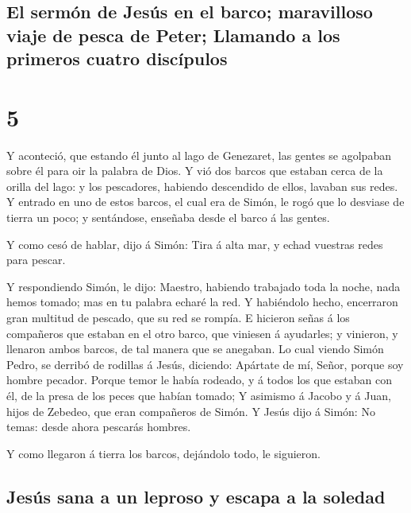 \hypertarget{el-sermuxf3n-de-jesuxfas-en-el-barco-maravilloso-viaje-de-pesca-de-peter-llamando-a-los-primeros-cuatro-discuxedpulos}{%
\subsection{El sermón de Jesús en el barco; maravilloso viaje de pesca
de Peter; Llamando a los primeros cuatro
discípulos}\label{el-sermuxf3n-de-jesuxfas-en-el-barco-maravilloso-viaje-de-pesca-de-peter-llamando-a-los-primeros-cuatro-discuxedpulos}}

\hypertarget{section-42-5}{%
\section{5}\label{section-42-5}}

 Y aconteció, que estando él junto al lago de Genezaret,
las gentes se agolpaban sobre él para oir la palabra de Dios.
 Y vió dos barcos que estaban cerca de la orilla del lago:
y los pescadores, habiendo descendido de ellos, lavaban sus redes.
 Y entrado en uno de estos barcos, el cual era de Simón,
le rogó que lo desviase de tierra un poco; y sentándose, enseñaba desde
el barco á las gentes.

 Y como cesó de hablar, dijo á Simón: Tira á alta mar, y
echad vuestras redes para pescar.

 Y respondiendo Simón, le dijo: Maestro, habiendo
trabajado toda la noche, nada hemos tomado; mas en tu palabra echaré la
red.  Y habiéndolo hecho, encerraron gran multitud de
pescado, que su red se rompía.  E hicieron señas á los
compañeros que estaban en el otro barco, que viniesen á ayudarles; y
vinieron, y llenaron ambos barcos, de tal manera que se anegaban.
 Lo cual viendo Simón Pedro, se derribó de rodillas á
Jesús, diciendo: Apártate de mí, Señor, porque soy hombre pecador.
 Porque temor le había rodeado, y á todos los que estaban
con él, de la presa de los peces que habían tomado;  Y
asimismo á Jacobo y á Juan, hijos de Zebedeo, que eran compañeros de
Simón. Y Jesús dijo á Simón: No temas: desde ahora pescarás hombres.

 Y como llegaron á tierra los barcos, dejándolo todo, le
siguieron.

\hypertarget{jesuxfas-sana-a-un-leproso-y-escapa-a-la-soledad}{%
\subsection{Jesús sana a un leproso y escapa a la
soledad}\label{jesuxfas-sana-a-un-leproso-y-escapa-a-la-soledad}}

